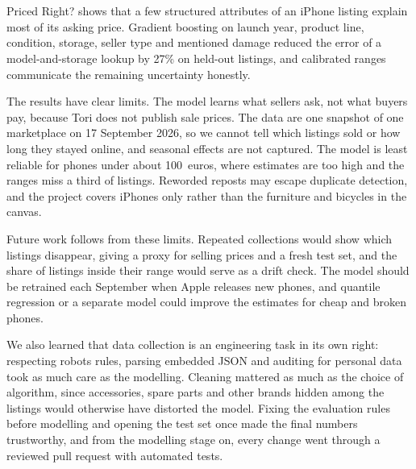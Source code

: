 \chapter{\concltitle}
\label{chap:concl}

Priced Right? shows that a few structured attributes of an iPhone listing explain most of its asking price. Gradient boosting on launch year, product line, condition, storage, seller type and mentioned damage reduced the error of a model-and-storage lookup by 27\% on held-out listings, and calibrated ranges communicate the remaining uncertainty honestly.

The results have clear limits. The model learns what sellers ask, not what buyers pay, because Tori does not publish sale prices. The data are one snapshot of one marketplace on 17 September 2026, so we cannot tell which listings sold or how long they stayed online, and seasonal effects are not captured. The model is least reliable for phones under about 100~euros, where estimates are too high and the ranges miss a third of listings. Reworded reposts may escape duplicate detection, and the project covers iPhones only rather than the furniture and bicycles in the canvas.

Future work follows from these limits. Repeated collections would show which listings disappear, giving a proxy for selling prices and a fresh test set, and the share of listings inside their range would serve as a drift check. The model should be retrained each September when Apple releases new phones, and quantile regression or a separate model could improve the estimates for cheap and broken phones.

We also learned that data collection is an engineering task in its own right: respecting robots rules, parsing embedded JSON and auditing for personal data took as much care as the modelling. Cleaning mattered as much as the choice of algorithm, since accessories, spare parts and other brands hidden among the listings would otherwise have distorted the model. Fixing the evaluation rules before modelling and opening the test set once made the final numbers trustworthy, and from the modelling stage on, every change went through a reviewed pull request with automated tests.
